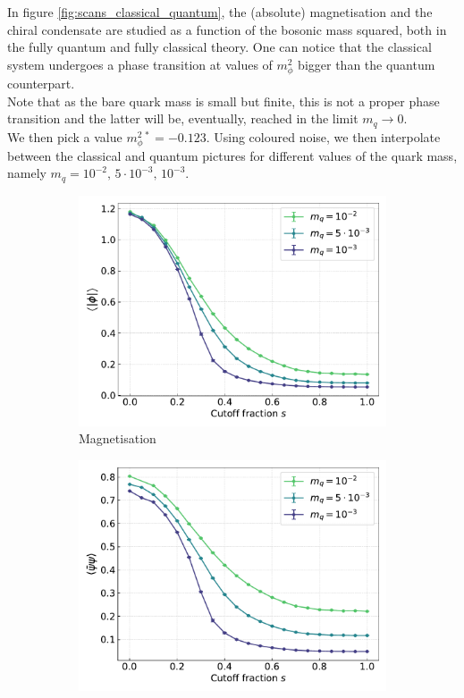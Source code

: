 In figure \ref{fig:scans_classical_quantum}, the (absolute) magnetisation and the chiral condensate are studied as a function of the bosonic mass squared, both in the fully quantum and fully classical theory. One can notice that the classical system undergoes a phase transition at values of $m_\phi^2$ bigger than the quantum counterpart. \\
Note that as the bare quark mass is small but finite, this is not a proper phase transition and the latter will be, eventually, reached in the limit $m_q \to 0$. \\
We then pick a value $m_\phi^{2 \, *} = -0.123$. Using coloured noise, we then interpolate between the classical and quantum pictures for different values of the quark mass, namely $m_q = 10^{-2}, \, 5 \cdot 10^{-3}, \, 10^{-3}$.
\begin{figure}[h!]
\centering
\begin{subfigure}{0.47\textwidth}	
	\includegraphics[width=\textwidth]{figures/chiral_PT/magnetisation.pdf}
    \caption{Magnetisation}
\end{subfigure}
\begin{subfigure}{0.47\textwidth}	
	\includegraphics[width=\textwidth]{figures/chiral_PT/condensate.pdf}

\end{subfigure}
\end{figure}
